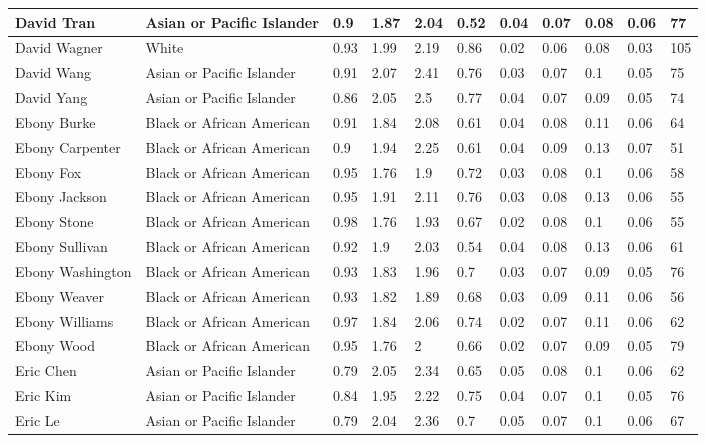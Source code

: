 \begin{table}[!ht]
\begin{tabular}{|l|l|l|l|l|l|l|l|l|l|l|}
        David Tran & Asian or Pacific Islander & 0.9 & 1.87 & 2.04 & 0.52 & 0.04 & 0.07 & 0.08 & 0.06 & 77 \\ \hline
        David Wagner & White & 0.93 & 1.99 & 2.19 & 0.86 & 0.02 & 0.06 & 0.08 & 0.03 & 105 \\ \hline
        David Wang & Asian or Pacific Islander & 0.91 & 2.07 & 2.41 & 0.76 & 0.03 & 0.07 & 0.1 & 0.05 & 75 \\ \hline
        David Yang & Asian or Pacific Islander & 0.86 & 2.05 & 2.5 & 0.77 & 0.04 & 0.07 & 0.09 & 0.05 & 74 \\ \hline
        Ebony Burke & Black or African American & 0.91 & 1.84 & 2.08 & 0.61 & 0.04 & 0.08 & 0.11 & 0.06 & 64 \\ \hline
        Ebony Carpenter & Black or African American & 0.9 & 1.94 & 2.25 & 0.61 & 0.04 & 0.09 & 0.13 & 0.07 & 51 \\ \hline
        Ebony Fox & Black or African American & 0.95 & 1.76 & 1.9 & 0.72 & 0.03 & 0.08 & 0.1 & 0.06 & 58 \\ \hline
        Ebony Jackson & Black or African American & 0.95 & 1.91 & 2.11 & 0.76 & 0.03 & 0.08 & 0.13 & 0.06 & 55 \\ \hline
        Ebony Stone & Black or African American & 0.98 & 1.76 & 1.93 & 0.67 & 0.02 & 0.08 & 0.1 & 0.06 & 55 \\ \hline
        Ebony Sullivan & Black or African American & 0.92 & 1.9 & 2.03 & 0.54 & 0.04 & 0.08 & 0.13 & 0.06 & 61 \\ \hline
        Ebony Washington & Black or African American & 0.93 & 1.83 & 1.96 & 0.7 & 0.03 & 0.07 & 0.09 & 0.05 & 76 \\ \hline
        Ebony Weaver & Black or African American & 0.93 & 1.82 & 1.89 & 0.68 & 0.03 & 0.09 & 0.11 & 0.06 & 56 \\ \hline
        Ebony Williams & Black or African American & 0.97 & 1.84 & 2.06 & 0.74 & 0.02 & 0.07 & 0.11 & 0.06 & 62 \\ \hline
        Ebony Wood & Black or African American & 0.95 & 1.76 & 2 & 0.66 & 0.02 & 0.07 & 0.09 & 0.05 & 79 \\ \hline
        Eric Chen & Asian or Pacific Islander & 0.79 & 2.05 & 2.34 & 0.65 & 0.05 & 0.08 & 0.1 & 0.06 & 62 \\ \hline
        Eric Kim & Asian or Pacific Islander & 0.84 & 1.95 & 2.22 & 0.75 & 0.04 & 0.07 & 0.1 & 0.05 & 76 \\ \hline
        Eric Le & Asian or Pacific Islander & 0.79 & 2.04 & 2.36 & 0.7 & 0.05 & 0.07 & 0.1 & 0.06 & 67 \\ \hline

\end{tabular}
\end{table}
